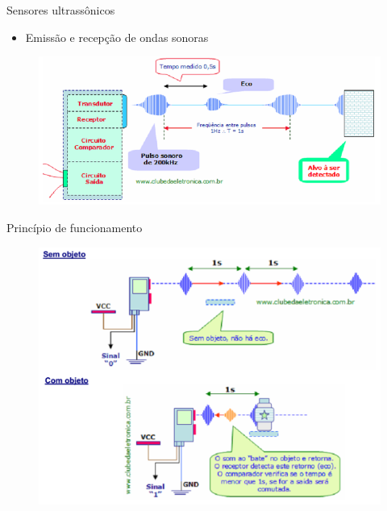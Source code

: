\documentclass[aspectratio=169,
				xcolor=table]{beamer}
\begin{document}
		\begin{frame}{Sensores ultrassônicos}
			\begin{itemize}
				\item Emissão e recepção de ondas sonoras
			\end{itemize}
			\begin{figure}
				\centering	
				\includegraphics[scale=.5]{../figs/cap03/Imagem27}
			\end{figure}	
		\end{frame}
		
		\begin{frame}{Princípio de funcionamento}
			\begin{figure}
				\centering	
				\includegraphics[scale=.25]{../figs/cap03/Imagem28}
			\end{figure}	
		\end{frame}
		
\end{document}
